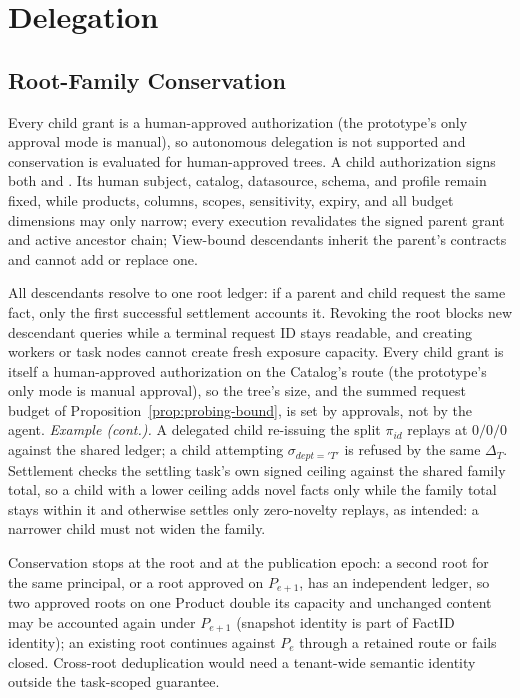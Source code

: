 \documentclass[10pt,journal,compsoc]{IEEEtran}
\newcommand{\code}[1]{\texttt{\detokenize{#1}}}
\begin{document}
\section{Delegation}
\label{sec:delegation}

\subsection{Root-Family Conservation}

Every child grant is a human-approved authorization (the prototype's only
approval mode is manual), so autonomous delegation is not supported and
conservation is evaluated for human-approved trees. A child authorization
signs both \code{root_task_id} and \code{parent_task_id}. Its human subject, catalog, datasource, schema, and
profile remain fixed, while products, columns, scopes, sensitivity, expiry, and
all budget dimensions may only narrow; every execution revalidates the signed
parent grant and active ancestor chain; View-bound descendants inherit
the parent's contracts and cannot add or replace one.

All descendants resolve to one root ledger: if a parent and child request
the same fact, only the first successful settlement accounts it. Revoking
the root blocks new descendant queries while a terminal request ID stays
readable, and creating workers or task nodes cannot create fresh exposure
capacity. Every child grant is itself a human-approved authorization on
the Catalog's route (the prototype's only mode is manual approval), so the
tree's size, and the summed request budget of
Proposition~\ref{prop:probing-bound}, is set by approvals, not by the
agent. \emph{Example (cont.).} A delegated
child re-issuing the split $\pi_{id}$ replays at $0/0/0$ against the
shared ledger; a child attempting $\sigma_{dept='T'}$ is refused by the
same $\Delta_T$. Settlement checks the settling task's own signed ceiling against
the shared family total, so a child with a lower ceiling adds novel facts only
while the family total stays within it and otherwise settles only
zero-novelty replays, as intended: a narrower child must not widen the family.

Conservation stops at the root and at the publication epoch: a second root
for the same principal, or a root approved on $P_{e+1}$, has an independent
ledger, so two approved roots on one Product double its capacity and
unchanged content may be accounted again under $P_{e+1}$ (snapshot identity
is part of FactID identity); an existing root continues against $P_e$ through
a retained route or fails closed. Cross-root deduplication would need a
tenant-wide semantic identity outside the task-scoped guarantee.
\end{document}
